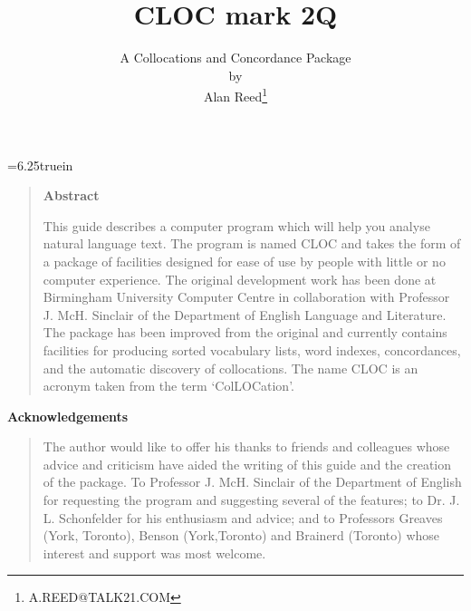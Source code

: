 %
\oddsidemargin=0in
\evensidemargin=0in
\textwidth=6.25truein          %

\headheight=0pt
\headsep=0pt
\topmargin=0in
\textheight=9.7in              %

\sloppy

\title{CLOC mark 2Q}
\author{A Collocations and Concordance Package\\by\\
        Alan Reed\thanks{A.REED@TALK21.COM}}
\maketitle

\begin{quote}
\begin{center}
{\bf Abstract}
\end{center}

This guide describes a computer program which will help you analyse
natural language text.
The program is named CLOC and takes the form of a
package of facilities designed for ease of use by people with little or
no computer experience.
The original development work has been done at Birmingham University
Computer Centre in collaboration with Professor J. McH. Sinclair of the
Department of English Language and Literature.
The package has been improved from the original and currently contains
facilities for producing sorted vocabulary lists, word indexes, concordances,
and the automatic discovery of collocations.
The name CLOC is an acronym taken from the term `ColLOCation'.
\end{quote}

\begin{center}
{\bf Acknowledgements}
\end{center}
\begin{quote}
The author would like to offer his thanks to friends and
colleagues whose advice and criticism have aided the writing of this
guide and the creation of the package.
To Professor J. McH. Sinclair of the Department of English for requesting
the program and suggesting several of the features; to Dr. J. L. Schonfelder
for his enthusiasm and advice; and to Professors Greaves (York, Toronto),
Benson (York,Toronto) and Brainerd (Toronto) whose interest and support
was most welcome.
\end{quote}
\newpage

